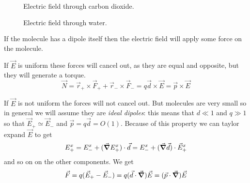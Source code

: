 \documentclass[12pt]{extarticle}
\begin{document}
\begin{description}
          \begin{figure}[H]
              \centering
              
              \caption{Electric field through carbon dioxide.}
          \end{figure}

          \begin{figure}[H]
              \centering
              
              \caption{Electric field through water.}
          \end{figure}

          If the molecule has a dipole itself then the electric field will apply some force on the molecule.

          If $\vec E$ is uniform these forces will  cancel out, as they are equal and opposite, but they will generate a torque.
          \begin{equation}
              \vec N = \vec r_+ \times \vec F_+ + \vec r_- \times \vec F_- = q\vec d \times \vec E = \vec p \times \vec E
          \end{equation}

          If $\vec E$ is not uniform the forces will not cancel out.
          But molecules are very small so in general we will assume they are \emph{ideal dipoles}: this means that $d \ll 1$ and $q \gg 1$ so that $\vec E_+ \simeq \vec E_-$ and $\vec p = q\vec d = O(1)$.
          Because of this property we can taylor expand $\vec E$ to get
          \begin{equation}
              E^x_+ = E^x_- + (\grad E^x_+) \cdot \vec d = E^x_- + (\grad \vec d) \cdot \vec E^x_+
          \end{equation}
          and so on on the other components.
          We get
          \begin{equation}
              \vec F = q (\vec E_+ - \vec E_-) = q (\vec d \cdot \grad) \vec E = (\vec p \cdot \grad) \vec E
          \end{equation}

\end{description}
\end{document}
